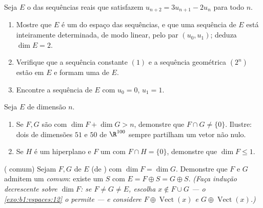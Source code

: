 \begin{exercise}[$\star\star$]\label{exo:b1:findim:10}
Seja $E$ o  das sequências reais que satisfazem $u_{n+2} =
3u_{n+1} - 2u_n$ para
todo $n$.
\begin{enumerate}
  \item Mostre que $E$ é um  do espaço das sequências, e
        que uma sequência de $E$ está inteiramente determinada, de
        modo linear, pelo par $(u_0, u_1)$; deduza $\dim E = 2$.
  \item Verifique que a sequência constante $(1)$ e a sequência
        geométrica $(2^n)$ estão em $E$ e formam uma  de $E$.
  \item Encontre a sequência de $E$ com $u_0 = 0$, $u_1 = 1$.
\end{enumerate}
\end{exercise}

\begin{exercise}[$\star\star$]\label{exo:b1:findim:11}
Seja $E$ de dimensão $n$.
\begin{enumerate}
  \item Se $F, G$ são  com $\dim F + \dim G > n$, demonstre que $F \cap G \neq \{0\}$.
        Ilustre: dois  de dimensões $51$ e $50$ de
        $\R^{100}$ sempre partilham um vetor não nulo.
  \item Se $H$ é um hiperplano e $F$ um  com $F \cap H =
        \{0\}$,
        demonstre que $\dim F \leq 1$.
\end{enumerate}
\end{exercise}

\begin{exercise}[$\star\star\star$]\label{exo:b1:findim:12}
( comum) Sejam $F, G$  de $E$ (de ) com $\dim F = \dim G$. Demonstre que $F$ e $G$ admitem um 
\emph{comum}: existe um  $S$ com $E = F
\oplus S = G \oplus S$. \emph{(Faça
indução decrescente sobre $\dim F$: se $F
\neq G \neq E$, escolha $x \notin F \cup G$ ---
o \cref{exo:b1:vspaces:12} o permite --- e considere $F \oplus
\operatorname{Vect}(x)$ e $G \oplus \operatorname{Vect}(x)$.)}
\end{exercise}

